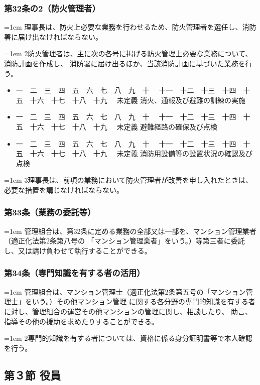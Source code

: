 \documentclass[
  luatex,
  paper=a4paper,
  fontsize=11pt,
  jafontsize=11pt,
  jlreq_notes,
]{jlreq}
\newcommand{\joumain}[1]{%
  \noindent\hangindent=1em\hangafter=1
  \hspace{1em}#1%
}
\newcommand{\kou}[2]{%
  \par\noindent\hangindent=1em\hangafter=1
  #1\hspace{1em}#2%
}
\def\toKansuji#1{
  \tempvls=#1
  \ifcase\tempvls
    \or 一　\or 二　\or 三　\or 四　\or 五　\or 六　\or 七　\or 八　\or 九　\or 十　
    \or 十一　\or 十二　\or 十三　\or 十四　\or 十五　\or 十六　\or 十七　\or 十八　\or 十九　
  \else 未定義
  \fi
}
\begin{document}
  \subsubsection*{第32条の2（防火管理者）}
  \joumain{理事長は、防火上必要な業務を行わせるため、防火管理者を選任し、消防署に届け出なければならない。}
  \kou{2}{防火管理者は、主に次の各号に掲げる防火管理上必要な業務について、消防計画を作成し、
  消防署に届け出るほか、当該消防計画に基づいた業務を行う。}
  \begin{itemize}[label={}, leftmargin=3em, itemindent=-2em]
    \item \toKansuji{1}消火、通報及び避難の訓練の実施
    \item \toKansuji{2}避難経路の確保及び点検
    \item \toKansuji{3}消防用設備等の設置状況の確認及び点検
  \end{itemize}
  \kou{3}{理事長は、前項の業務において防火管理者が改善を申し入れたときは、必要な措置を講じなければならない。}

  \subsubsection*{第33条（業務の委託等）}
  \joumain{管理組合は、第32条に定める業務の全部又は一部を、マンション管理業者（適正化法第2条第八号の
  「マンション管理業者」をいう。）等第三者に委託し、又は請け負わせて執行することができる。}

  \subsubsection*{第34条（専門知識を有する者の活用）}
  \joumain{管理組合は、マンション管理士（適正化法第2条第五号の「マンション管理士」をいう。）その他マンション管理
  に関する各分野の専門的知識を有する者に対し、管理組合の運営その他マンションの管理に関し、相談したり、
  助言、指導その他の援助を求めたりすることができる。}
  \kou{2}{専門的知識を有する者については、資格に係る身分証明書等で本人確認を行う。}
  
  \begin{center}
  \subsection*{第３節 役員}
  \end{center}
\end{document}
